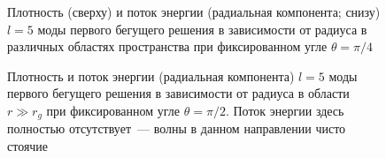\documentclass[compress, 9pt]{beamer}
\begin{document}
    \begin{frame}
        \begin{figure}[h]
            \centering
            \hspace{8pt}%
            \hspace{8pt}%
            \hspace{8pt}%
            \hspace{8pt}%
            \hspace{8pt}%
            \hspace{8pt}%
            \caption[]{Плотность (сверху) и поток энергии (радиальная компонента; снизу) $l=5$ моды первого бегущего решения в зависимости от радиуса в различных областях пространства при фиксированном угле $\theta = \pi/4$}%
            \label{fig:scal-ee-uu}%
        \end{figure}

    \end{frame}

    \begin{frame}
        \begin{figure}[h]
            \centering
            \hspace{8pt}%
            \hspace{8pt}
            \caption[]{Плотность  и поток энергии (радиальная компонента)  $l=5$ моды первого бегущего решения в зависимости от радиуса в области $r \gg r_g$ при фиксированном угле $\theta = \pi/2$. Поток энергии здесь полностью отсутствует~--- волны в данном направлении чисто стоячие}%
            \label{fig:scal-ee-uu-p2}%
        \end{figure}

    \end{frame}
\end{document}
